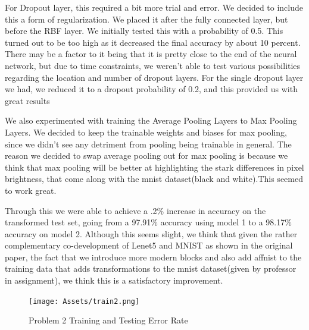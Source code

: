 \documentclass{article}
\begin{document}
For Dropout layer, this required a bit more trial and error. We decided to include this a form of regularization. We placed it after the fully connected layer, but before the RBF layer. We initially tested this with a probability of 0.5. This turned out to be too high as it decreased the final accuracy by about 10 percent. There may be a factor to it being that it is pretty close to the end of the neural network, but due to time constraints, we weren't able to test various possibilities regarding the location and number of dropout layers. For the single dropout layer we had, we reduced it to a dropout probability of 0.2, and this provided us with great results

We also experimented with training the Average Pooling Layers to Max Pooling Layers. We decided to keep the trainable weights and biases for max pooling, since we didn't see any detriment from pooling being trainable in general. The reason we decided to swap average pooling out for max pooling is because we think that max pooling will be better at highlighting the stark differences in pixel brightness, that come along with the mnist dataset(black and white).This seemed to work great.

Through this we were able to achieve a .2\% increase in accuracy on the transformed test set, going from
a 97.91\% accuracy using model 1 to a 98.17\% accuracy on model 2. Although this seems slight, we think that given the rather complementary co-development of Lenet5 and MNIST as shown in the original paper, the fact that we introduce more modern blocks and also add affnist to the training data that adds transformations to the mnist dataset(given by professor in assignment), we think this is a satisfactory improvement.

\begin{figure}[h]
    \centering
    \texttt{[image: Assets/train2.png]}
    \caption{Problem 2 Training and Testing Error Rate}
    \label{fig:3}
\end{figure}
\end{document}
